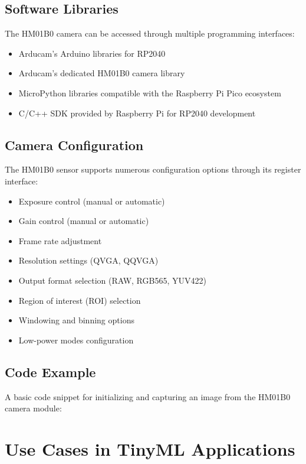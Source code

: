 \subsection{Software Libraries}
The HM01B0 camera can be accessed through multiple programming interfaces:
\begin{itemize}
	\item Arducam's Arduino libraries for RP2040 \cite{Arducam:2022}
	\item Arducam's dedicated HM01B0 camera library
	\item MicroPython libraries compatible with the Raspberry Pi Pico ecosystem
	\item C/C++ SDK provided by Raspberry Pi for RP2040 development \cite{RaspberryPi:2020a}
\end{itemize}

\subsection{Camera Configuration}
The HM01B0 sensor supports numerous configuration options through its register interface:
\begin{itemize}
	\item Exposure control (manual or automatic)
	\item Gain control (manual or automatic)
	\item Frame rate adjustment
	\item Resolution settings (QVGA, QQVGA)
	\item Output format selection (RAW, RGB565, YUV422)
	\item Region of interest (ROI) selection
	\item Windowing and binning options
	\item Low-power modes configuration
\end{itemize}

\subsection{Code Example}
A basic code snippet for initializing and capturing an image from the HM01B0 camera module:

\begin{code}[h!]
	\label{Camera:example}
\end{code}

\section{Use Cases in TinyML Applications}
